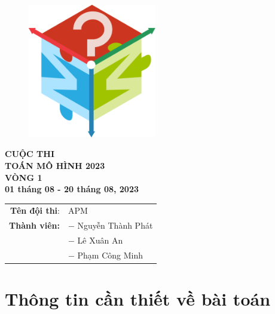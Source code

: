 \documentclass[12pt]{report}
\begin{document}
\thispagestyle{empty}


\begin{titlepage}
	\begin{figure}[h]
		\centering
		\includegraphics[width=0.5\textwidth]{images/logotmh.png}
	\end{figure}

	\begin{center}
		\textbf{{\Huge CUỘC THI}} \\[10pt]
		\textbf{\LARGE TOÁN MÔ HÌNH 2023}\\[10pt]
		\textbf{\LARGE VÒNG 1}\\[10pt]
		\textbf{ 01 tháng 08  - 20 tháng 08, 2023}
		\\[3.0cm]

		\begin{tabular}{r l}
			\textbf{Tên đội thi}: &APM \\
			\textbf{Thành viên:}
				&$-$ Nguyễn Thành Phát \\
				&$-$ Lê Xuân An \\
				&$-$ Phạm Công Minh
		\end{tabular}
	\end{center}

	\vspace{\fill}
\end{titlepage}

\newpage

\tableofcontents

\chapter*{Thông tin cần thiết về bài toán}
\end{document}

